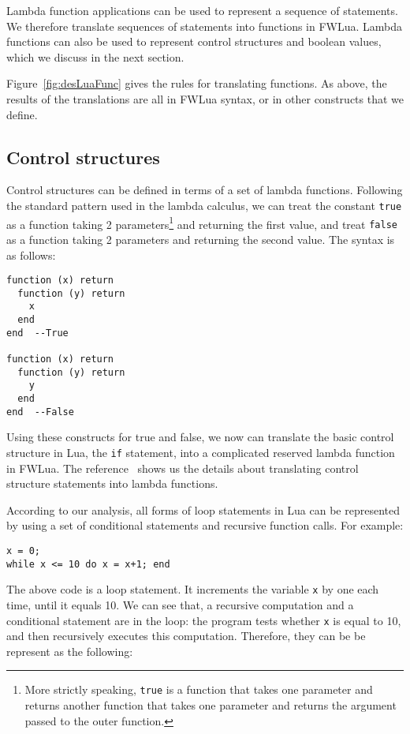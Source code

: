 
Lambda function applications can be used to represent a sequence of  statements. We therefore translate sequences of statements into functions in FWLua. Lambda functions can also be used to represent control structures and boolean values, which we discuss in the next section.

Figure~\ref{fig:desLuaFunc} gives the rules for translating functions. As above, the results of the translations are all in FWLua syntax, or in other constructs that we define.

\subsection{Control structures}
Control structures can be defined in terms of a set of lambda functions. 
Following the standard pattern used in the lambda calculus,
we can treat the constant {\tt true} as a function taking 2 parameters\footnote{
  More strictly speaking, {\tt true} is a function that takes one parameter
  and returns another function that takes one parameter and returns
  the argument passed to the outer function.
}
and returning the first value, and treat {\tt false} as a function taking 2 parameters and returning the second value. The syntax is as follows:

\begin{verbatim}
function (x) return 
  function (y) return 
    x
  end
end  --True

function (x) return 
  function (y) return 
    y
  end
end  --False
\end{verbatim}

Using these constructs for true and false, we now can translate the basic control structure in Lua, the {\tt if} statement, into a complicated reserved lambda function in FWLua. The reference~\cite{TAPL} shows us the details about translating control structure statements into lambda functions.

According to our analysis, all forms of loop statements in Lua can be represented by using a set of conditional statements and recursive function calls. For example:

\begin{verbatim}
x = 0;
while x <= 10 do x = x+1; end
\end{verbatim}

The above code is a loop statement. It increments the variable {\tt x} by one each time, until it equals 10. We can see that, a recursive computation and a conditional statement are in the loop: the program tests whether {\tt x} is equal to 10, and then recursively executes this computation. Therefore, they can be be represent as the following:

